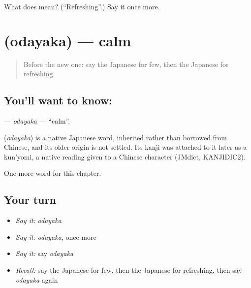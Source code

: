 \begin{tcolorbox}[breakable,colback=teal!4,colframe=teal!35!black,title={Before you move on}]
What does  mean? (\textquotedblleft{}Refreshing\textquotedblright{}.) Say it once more.
\end{tcolorbox}
\section[\texorpdfstring{\ja{おだやか} (odayaka)}{おだやか (odayaka)}]{ (odayaka) — calm}

\label{lesson:JA-C127-odayaka}



\begin{quote}
Before the new one: say the Japanese for few, then the Japanese for refreshing.
\end{quote}

\subsection*{You'll want to know: }
\textbf{} — \emph{odayaka} — \textquotedblleft{}calm\textquotedblright{}.

\begin{cousinweb}
\textbf{} (\emph{odayaka}) is a native Japanese word, inherited rather than borrowed from Chinese, and its older origin is not settled. Its kanji was attached to it later as a kun'yomi, a native reading given to a Chinese character (JMdict, KANJIDIC2).
\end{cousinweb}

\begin{grammarlens}[title={What you've built}]
One more word for this chapter.
\end{grammarlens}

\subsection*{Your turn}
\begin{itemize}
\raggedright
  \item \emph{Say it:} \emph{odayaka}
  \item \emph{Say it:} \emph{odayaka}, once more
  \item \emph{Say it:} say \emph{odayaka}
  \item \emph{Recall:} say the Japanese for few, then the Japanese for refreshing, then say \emph{odayaka} again
\end{itemize}

